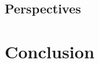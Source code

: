 \documentclass[Ingles]{phdthesis}
\begin{document}
\section{Perspectives}



\chapter{Conclusion}



\end{document}
